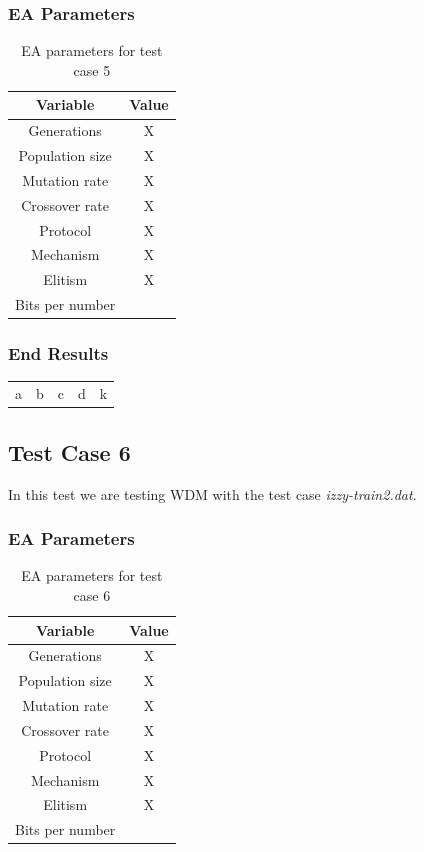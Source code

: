 \subsubsection{EA Parameters}\label{sec:test-case-5-parameters}
\begin{table}
	\begin{tabular}{c c}
		Variable & Value \\
		\hline
		Generations & X \\
		\hline
		Population size & X \\
		\hline
		Mutation rate & X \\
		\hline
		Crossover rate & X \\
		\hline
		Protocol & X \\
		\hline
		Mechanism & X \\
		\hline
		Elitism & X \\
		\hline
		Bits per number & \\
	\end{tabular}
	\caption{EA parameters for test case 5}
\end{table}
\subsubsection{End Results}\label{sec:test-case-5-results}
\begin{table}
	\begin{tabular}{c c c c c}
		a & b & c & d & k \\
	\end{tabular}
\end{table}

\subsection{Test Case 6}\label{sec:test-case-6}
In this test we are testing WDM with the test case
\textit{izzy-train2.dat}.
\subsubsection{EA Parameters}\label{sec:test-case-6-parameters}
\begin{table}
	\begin{tabular}{c c}
		Variable & Value \\
		\hline
		Generations & X \\
		\hline
		Population size & X \\
		\hline
		Mutation rate & X \\
		\hline
		Crossover rate & X \\
		\hline
		Protocol & X \\
		\hline
		Mechanism & X \\
		\hline
		Elitism & X \\
		\hline
		Bits per number & \\
	\end{tabular}
	\caption{EA parameters for test case 6}
\end{table}
